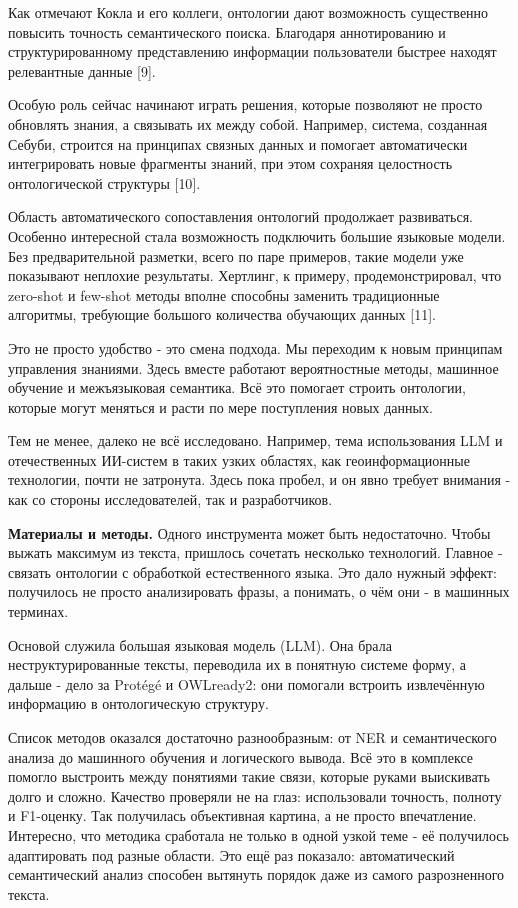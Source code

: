 \begin{multicols}{2}
Как отмечают Кокла и его коллеги, онтологии дают возможность существенно
повысить точность семантического поиска. Благодаря аннотированию и
структурированному представлению информации пользователи быстрее находят
релевантные данные {[}9{]}.

Особую роль сейчас начинают играть решения, которые позволяют не просто
обновлять знания, а связывать их между собой. Например, система,
созданная Себуби, строится на принципах связных данных и помогает
автоматически интегрировать новые фрагменты знаний, при этом сохраняя
целостность онтологической структуры {[}10{]}.

Область автоматического сопоставления онтологий продолжает развиваться.
Особенно интересной стала возможность подключить большие языковые
модели. Без предварительной разметки, всего по паре примеров, такие
модели уже показывают неплохие результаты. Хертлинг, к примеру,
продемонстрировал, что zero-shot и few-shot методы вполне способны
заменить традиционные алгоритмы, требующие большого количества обучающих
данных {[}11{]}.

Это не просто удобство - это смена подхода. Мы переходим к новым
принципам управления знаниями. Здесь вместе работают вероятностные
методы, машинное обучение и межъязыковая семантика. Всё это помогает
строить онтологии, которые могут меняться и расти по мере поступления
новых данных.

Тем не менее, далеко не всё исследовано. Например, тема использования
LLM и отечественных ИИ-систем в таких узких областях, как
геоинформационные технологии, почти не затронута. Здесь пока пробел, и
он явно требует внимания - как со стороны исследователей, так и
разработчиков.

{\bfseries Материалы и методы.} Одного инструмента может быть недостаточно.
Чтобы выжать максимум из текста, пришлось сочетать несколько технологий.
Главное - связать онтологии с обработкой естественного языка. Это дало
нужный эффект: получилось не просто анализировать фразы, а понимать, о
чём они - в машинных терминах.

Основой служила большая языковая модель (LLM). Она брала
неструктурированные тексты, переводила их в понятную системе форму, а
дальше - дело за Protégé и OWLready2: они помогали встроить извлечённую
информацию в онтологическую структуру.

Список методов оказался достаточно разнообразным: от NER и
семантического анализа до машинного обучения и логического вывода. Всё
это в комплексе помогло выстроить между понятиями такие связи, которые
руками выискивать долго и сложно. Качество проверяли не на глаз:
использовали точность, полноту и F1-оценку. Так получилась объективная
картина, а не просто впечатление. Интересно, что методика сработала не
только в одной узкой теме - её получилось адаптировать под разные
области. Это ещё раз показало: автоматический семантический анализ
способен вытянуть порядок даже из самого разрозненного текста.


\end{multicols}

